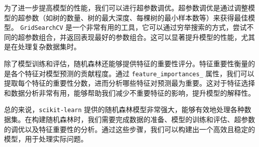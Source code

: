 \documentclass[AutoFakeBold]{LZUThesis-PgD&PhD}
\begin{document}
        为了进一步提高模型的性能，我们可以进行超参数调优。超参数调优是通过调整模型的超参数（如树的数量、树的最大深度、每棵树的最小样本数等）来获得最佳模型。 \texttt{GridSearchCV} 是一个非常有用的工具，它可以通过穷举搜索的方式，尝试不同的超参数组合，并返回表现最好的参数组合。这可以显著提升模型的性能，尤其是在处理复杂数据集时。
        
        除了模型训练和评估，随机森林还能够提供特征的重要性评分。特征重要性衡量的是各个特征对模型预测的贡献程度。通过 \texttt{feature\_importances\_} 属性，我们可以提取每个特征的重要性分数，进而分析哪些特征对预测最为重要。这对于特征选择和数据分析非常有用，能够帮助我们减少不重要特征的影响，提升模型的解释性。
        
        总的来说，\texttt{scikit-learn} 提供的随机森林模型非常强大，能够有效地处理各种数据集。在构建随机森林时，我们需要完成数据的准备、模型的训练和评估、超参数的调优以及特征重要性的分析。通过这些步骤，我们可以构建出一个高效且稳定的模型，用于处理实际问题。
            
\end{document}
